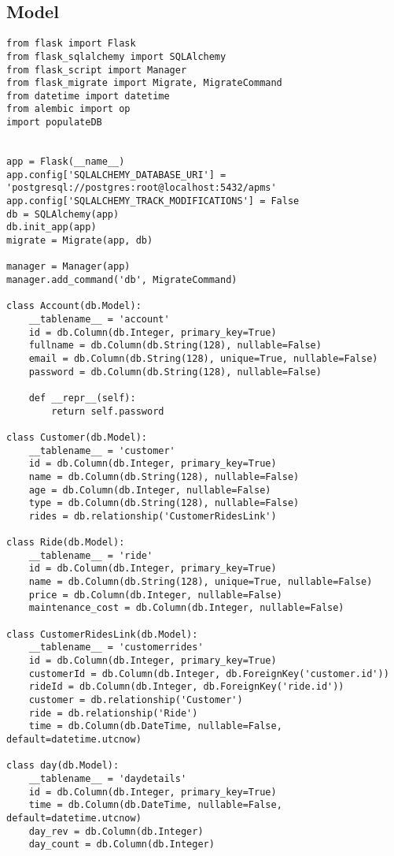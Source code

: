 \subsection{Model}
\thispagestyle{fancy}
\begin{verbatim}
from flask import Flask
from flask_sqlalchemy import SQLAlchemy
from flask_script import Manager
from flask_migrate import Migrate, MigrateCommand
from datetime import datetime
from alembic import op
import populateDB


app = Flask(__name__)
app.config['SQLALCHEMY_DATABASE_URI'] = 'postgresql://postgres:root@localhost:5432/apms'
app.config['SQLALCHEMY_TRACK_MODIFICATIONS'] = False
db = SQLAlchemy(app)
db.init_app(app)
migrate = Migrate(app, db)

manager = Manager(app)
manager.add_command('db', MigrateCommand)

class Account(db.Model):
    __tablename__ = 'account'
    id = db.Column(db.Integer, primary_key=True)
    fullname = db.Column(db.String(128), nullable=False)
    email = db.Column(db.String(128), unique=True, nullable=False)
    password = db.Column(db.String(128), nullable=False)

    def __repr__(self):
        return self.password

class Customer(db.Model):
    __tablename__ = 'customer'
    id = db.Column(db.Integer, primary_key=True)
    name = db.Column(db.String(128), nullable=False)
    age = db.Column(db.Integer, nullable=False)
    type = db.Column(db.String(128), nullable=False)
    rides = db.relationship('CustomerRidesLink')

class Ride(db.Model):
    __tablename__ = 'ride'
    id = db.Column(db.Integer, primary_key=True)
    name = db.Column(db.String(128), unique=True, nullable=False)
    price = db.Column(db.Integer, nullable=False)
    maintenance_cost = db.Column(db.Integer, nullable=False)

class CustomerRidesLink(db.Model):
    __tablename__ = 'customerrides'
    id = db.Column(db.Integer, primary_key=True)
    customerId = db.Column(db.Integer, db.ForeignKey('customer.id'))
    rideId = db.Column(db.Integer, db.ForeignKey('ride.id'))
    customer = db.relationship('Customer')
    ride = db.relationship('Ride')
    time = db.Column(db.DateTime, nullable=False, default=datetime.utcnow)

class day(db.Model):
    __tablename__ = 'daydetails'
    id = db.Column(db.Integer, primary_key=True)
    time = db.Column(db.DateTime, nullable=False, default=datetime.utcnow)
    day_rev = db.Column(db.Integer)
    day_count = db.Column(db.Integer)


\end{verbatim}
